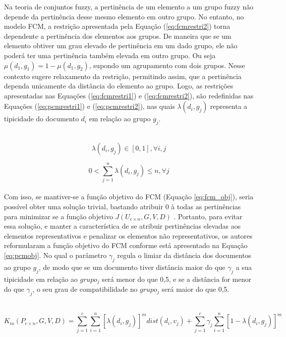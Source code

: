 Na teoria de conjuntos fuzzy, a pertinência de um elemento a um grupo fuzzy não depende da
pertinência desse mesmo elemento em outro grupo. No entanto, no modelo FCM, a restrição apresentada
pela Equação (\ref{eq:fcmrestri2}) torna dependente a pertinência dos elementos aos grupos. De
maneira que se um elemento obtiver um grau elevado de pertinência em um dado grupo, ele não poderá
ter uma pertinência também elevada em outro grupo. Ou seja $\mu(d_1, g_1) = 1-\mu(d_1,g_2)$, supondo
um agrupamento com dois grupos. Nesse contexto  sugere relaxamento da
restrição, permitindo assim, que a pertinência dependa unicamente da distância do elemento ao grupo.
Logo, as restrições apresentadas nas Equações (\ref{eq:fcmrestri1}) e (\ref{eq:fcmrestri2}), são
redefinidas nas Equações (\ref{eq:pcmrestri1}) e (\ref{eq:pcmrestri2}), nas quais $\lambda(d_i,g_j)$
representa a tipicidade do documento $d_i$ em relação ao grupo $g_j$.

\leavevmode\\
\begin{equation}
  \lambda(d_i, g_j) \in [0,1], \forall i,j
  \label{eq:pcmrestri1}
\end{equation}

\begin{equation}
  0 < \sum_{j=1}^n \lambda(d_i, g_j) \leq n, \forall j
  \label{eq:pcmrestri2}
\end{equation}
\leavevmode\\

Com isso, se mantiver-se a função objetivo do FCM (Equação \ref{eq:fcm_obj}), seria possível obter
uma solução trivial, bastando atribuir $0$ à todas as pertinências para minimizar se a função
objetivo $J(U_{c \times n},G,V,D)$ \cite{Krishnapuram1993}.  Portanto, para evitar essa solução, e
manter a característica de se atribuir pertinências elevadas aos elementos representativos e
penalizar os elementos não representativos, os autores reformularam a função objetivo do FCM
conforme está apresentado na Equação \ref{eq:pcmobj}. No qual o parâmetro $\gamma_j$ regula o limiar
da distância dos documentos ao grupo $g_j$, de modo que se um documento tiver distância maior do que
$\gamma_j$ a sua tipicidade em relação ao $grupo_j$ será menor do que 0,5, e se a distância for
menor do que $\gamma_j$, o seu grau de compatibilidade no $grupo_j$ será maior do que 0,5.

\leavevmode\\
\begin{equation}
  K_m(P_{c \times n},G,V,D) = \sum_{j=1}^c \sum_{i=1}^n [\lambda(d_i, g_j)]^m dist(d_i, v_j) +
  \sum_{j=1}^c \gamma_j \sum_{i=1}^n [1 - \lambda(d_i, g_j)]^m
  \label{eq:pcmobj}
\end{equation}
\leavevmode\\

